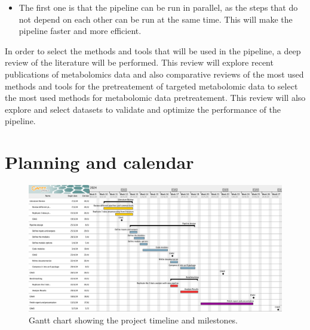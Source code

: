 \documentclass[ENG, BIB]{TFUOC}%
\begin{document}
\begin{itemize}
    \item The first one is that the pipeline can be run in parallel, as the steps that do not depend on each other can be run at the same time. This will make the pipeline faster and more efficient.
\end{itemize}


In order to select the methods and tools that will be used in the pipeline, a deep review of the literature will be performed. This review will explore recent publications of metabolomics data and also comparative reviews of the most used methods and tools for the pretreatement of targeted metabolomic data to select the most used methods for metabolomic data pretreatement. This review will also explore and select datasets to validate and optimize the performance of the pipeline.







\section{Planning and calendar}

\begin{figure}[htbp]
    \centering
    \includegraphics[width=\textwidth]{Images/gantt.png}
    \caption{Gantt chart showing the project timeline and milestones.}
    \label{fig:gantt}
\end{figure}

\end{document}
